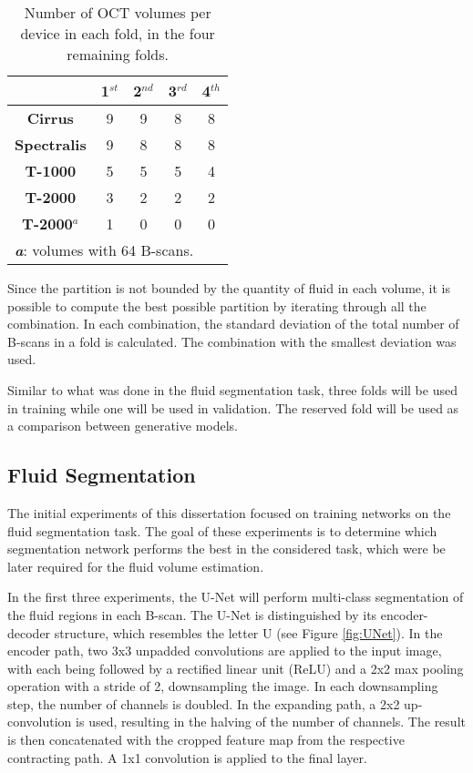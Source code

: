 \begin{table*}[!ht]
	\setlength{\tabcolsep}{6pt}
	\renewcommand{\arraystretch}{1.3}
	\caption{Number of OCT volumes per device in each fold, in the four remaining folds.}
	\centering
	\begin{tabular}{|c|c|c|c|c|}
		\hline
		& \textbf{1$^{st}$} & \textbf{2$^{nd}$} & \textbf{3$^{rd}$} & \textbf{4$^{th}$} \\
		\hline
		\textbf{Cirrus} & 9 & 9 & 8 & 8 \\
		\textbf{Spectralis} & 9 & 8 & 8 & 8 \\
		\textbf{T-1000} & 5 & 5 & 5 & 4 \\
		\textbf{T-2000} & 3 & 2 & 2 & 2 \\
		\textbf{T-2000$^{a}$} & 1 & 0 & 0 & 0 \\
		\hline
		\multicolumn{5}{l}{\textbf{\textit{a}}: volumes with 64 B-scans.} \\
	\end{tabular}
	\label{tab:FourFoldSplit}
\end{table*}

Since the partition is not bounded by the quantity of fluid in each volume, it is possible to compute the best possible partition by iterating through all the combination. In each combination, the standard deviation of the total number of B-scans in a fold is calculated. The combination with the smallest deviation was used. 
\par
Similar to what was done in the fluid segmentation task, three folds will be used in training while one will be used in validation. The reserved fold will be used as a comparison between generative models.

\subsection{Fluid Segmentation}
The initial experiments of this dissertation focused on training networks on the fluid segmentation task. The goal of these experiments is to determine which segmentation network performs the best in the considered task, which were be later required for the fluid volume estimation.
\par
In the first three experiments, the U-Net \parencite{Ronneberger2015} will perform multi-class segmentation of the fluid regions in each B-scan. The U-Net is distinguished by its encoder-decoder structure, which resembles the letter U (see Figure \ref{fig:UNet}). In the encoder path, two 3x3 unpadded convolutions are applied to the input image, with each being followed by a rectified linear unit (ReLU) and a 2x2 max pooling operation with a stride of 2, downsampling the image. In each downsampling step, the number of channels is doubled. In the expanding path, a 2x2 up-convolution is used, resulting in the halving of the number of channels. The result is then concatenated with the cropped feature map from the respective contracting path. A 1x1 convolution is applied to the final layer.

